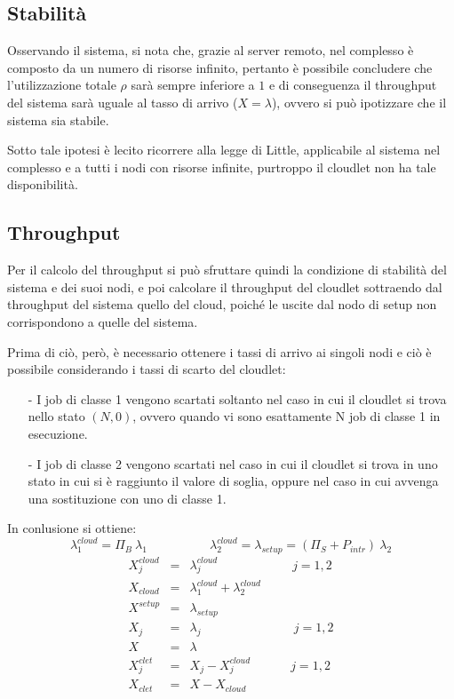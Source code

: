 \subsection{Stabilità}
Osservando il sistema, si nota che, grazie al server remoto, nel complesso è
composto da un numero di risorse infinito, pertanto è possibile concludere che
l'utilizzazione totale $\rho$ sarà sempre inferiore a $1$ e di conseguenza il
throughput del sistema sarà uguale al tasso di arrivo ($X=\lambda$), ovvero si
può ipotizzare che il sistema sia stabile.

Sotto tale ipotesi è lecito ricorrere alla legge di Little, applicabile
al sistema nel complesso e a tutti i nodi con risorse infinite, purtroppo il
cloudlet non ha tale disponibilità.
\subsection{Throughput}
Per il calcolo del throughput si può sfruttare quindi la condizione di stabilità
del sistema e dei suoi nodi, e poi calcolare il throughput del cloudlet
sottraendo dal throughput del sistema quello del cloud, poiché le uscite dal
nodo di setup non corrispondono a quelle del sistema.

Prima di ciò, però, è necessario ottenere i tassi di arrivo ai singoli nodi e
ciò è possibile considerando i tassi di scarto del cloudlet:
\begin{itemize}
\item[-]I job di classe 1 vengono scartati soltanto nel caso in cui il cloudlet
si trova nello stato $(N, 0)$, ovvero quando vi sono esattamente N job di classe
1 in esecuzione.
\item[-]I job di classe 2 vengono scartati nel caso in cui il cloudlet si trova
in uno stato in cui si è raggiunto il valore di soglia, oppure nel caso in cui
avvenga una sostituzione con uno di classe 1. 
\end{itemize}

In conlusione si ottiene:
\begin{displaymath}
\lambda_1^{cloud} = \Pi_B \ \lambda_1 
\qquad\quad\qquad
\lambda_2^{cloud} = \lambda_{setup} = (\Pi_S + P_{intr}) \ \lambda_2 
\end{displaymath}
%
\begin{eqnarray}
X_j^{cloud} &=& \lambda_j^{cloud}   \qquad\quad\qquad\quad j=1,2 \\
X_{cloud} &=& \lambda_1^{cloud} + \lambda_2^{cloud}   \\
X^{setup} &=& \lambda_{setup}   \\
X_j &=& \lambda_j  \ \quad\qquad\quad\qquad \ \quad j=1,2 \\
X &=& \lambda \\
X_j^{clet} &=& X_j - X_j^{cloud} \ \qquad\quad j=1,2 \\
X_{clet} &=& X - X_{cloud} 
\end{eqnarray}
